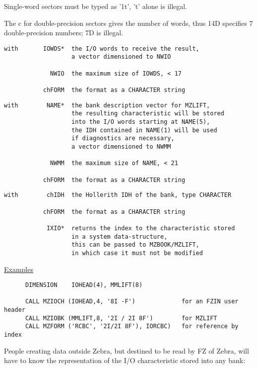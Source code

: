 Single-word sectors must be typed as '1t', 't' alone is illegal.

The c for double-precision sectors gives the number of words,
thus 14D specifies 7 double-precision numbers; 7D is illegal.

\begin{verbatim}
with       IOWDS*  the I/O words to receive the result,
                   a vector dimensioned to NWIO

             NWIO  the maximum size of IOWDS, < 17

           chFORM  the format as a CHARACTER string

\end{verbatim} 
\begin{verbatim}
with        NAME*  the bank description vector for MZLIFT,
                   the resulting characteristic will be stored
                   into the I/O words starting at NAME(5),
                   the IDH contained in NAME(1) will be used
                   if diagnostics are necessary,
                   a vector dimensioned to NWMM

             NWMM  the maximum size of NAME, < 21

           chFORM  the format as a CHARACTER string

\end{verbatim} 
\begin{verbatim}
with        chIDH  the Hollerith IDH of the bank, type CHARACTER

           chFORM  the format as a CHARACTER string

            IXIO*  returns the index to the characteristic stored
                   in a system data-structure,
                   this can be passed to MZBOOK/MZLIFT,
                   in which case it must not be modified
\end{verbatim} 

\ul{Examples}
\begin{verbatim}
      DIMENSION    IOHEAD(4), MMLIFT(8)

      CALL MZIOCH (IOHEAD,4, '8I -F')             for an FZIN user header
      CALL MZIOBK (MMLIFT,8, '2I / 2I 8F')        for MZLIFT
      CALL MZFORM ('RCBC', '2I/2I 8F'), IORCBC)   for reference by index
\end{verbatim} 

People creating data outside Zebra,
but destined to be read by FZ of Zebra,
will have to know the representation of the I/O characteristic
stored into any bank:

